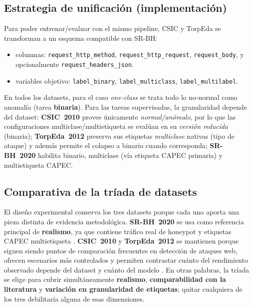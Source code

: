 \documentclass[12pt,oneside]{report}
\begin{document}
\subsection{Estrategia de unificación (implementación)}
Para poder entrenar/evaluar con el mismo pipeline, CSIC y TorpEda se transforman a un esquema compatible con SR-BH:
\begin{itemize}[leftmargin=*]
  \item columnas: \texttt{request\_http\_method}, \texttt{request\_http\_request}, \texttt{request\_body}, y opcionalmente \texttt{request\_headers\_json}.
  \item variables objetivo: \texttt{label\_binary}, \texttt{label\_multiclass}, \texttt{label\_multilabel}.
\end{itemize}

En todos los datasets, para el caso \textit{one-class} se trata todo lo no-normal como anomalía (tarea \textbf{binaria}). Para las tareas supervisadas, la granularidad depende del dataset: \textbf{CSIC~2010} provee únicamente \textit{normal/anómalo}, por lo que las configuraciones multiclase/multietiqueta se evalúan en su \textit{versión reducida} (binaria); \textbf{TorpEda~2012} preserva sus etiquetas \textit{multiclase} nativas (tipo de ataque) y además permite el colapso a binario cuando corresponda; \textbf{SR-BH~2020} habilita binario, multiclase (vía etiqueta CAPEC primaria) y multietiqueta CAPEC.

\subsection{Comparativa de la tríada de datasets}
El diseño experimental conserva los tres datasets porque cada uno aporta una pieza distinta de evidencia metodológica. \textbf{SR-BH~2020} se usa como referencia principal de \textbf{realismo}, ya que contiene tráfico real de honeypot y etiquetas CAPEC multietiqueta \cite{srbh_dataverse,srbh_paper}. \textbf{CSIC~2010} y \textbf{TorpEda~2012} se mantienen porque siguen siendo puntos de comparación frecuentes en detección de ataques web, ofrecen escenarios más controlados y permiten contrastar cuánto del rendimiento observado depende del dataset y cuánto del modelo \cite{csic2010_impact,csic2010_doc,torpeda_2012}. En otras palabras, la tríada se elige para cubrir simultáneamente \textbf{realismo}, \textbf{comparabilidad con la literatura} y \textbf{variación en granularidad de etiquetas}; quitar cualquiera de los tres debilitaría alguna de esas dimensiones.
\end{document}
